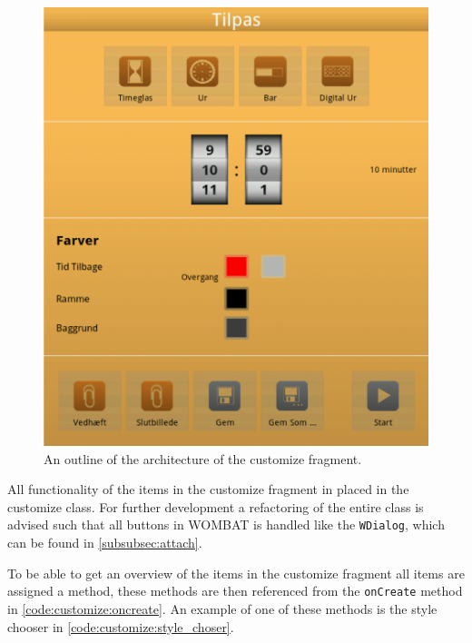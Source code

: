 \begin{figure}[H]
	\centering
		\includegraphics[width=\textwidth]{Images/Implementation/customize_layout.png}
	\caption{An outline of the architecture of the customize fragment.}
	\label{fig:customize:layout}
\end{figure}

All functionality of the items in the customize fragment in placed in the customize class.
For further development a refactoring of the entire class is advised such that all buttons in WOMBAT is handled like the \texttt{WDialog}, which can be found in \autoref{subsubsec:attach}.

To be able to get an overview of the items in the customize fragment all items are assigned a method, these methods are then referenced from the \texttt{onCreate} method in \autoref{code:customize:oncreate}. An example of one of these methods is the style chooser in \autoref{code:customize:style_choser}.


